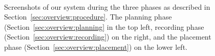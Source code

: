 \documentclass[review]{vgtc}                 %
\begin{document}
\begin{figure}[t]
  \centering
  \begin{minipage}[b]{0.45\columnwidth}
  \\
  \vspace*{-0.02cm}
  \end{minipage}
  \caption{Screenshots of our system during the three phases as described in Section~\ref{sec:overview:procedure}. The planning phase (Section~\ref{sec:overview:planning} in the top left, recording phase (Section~\ref{sec:overview:recording}) on the right, and the placement phase (Section~\ref{sec:overview:placement}) on the lower left.}
  \label{fig:screenshot}
\end{figure}
\end{document}
